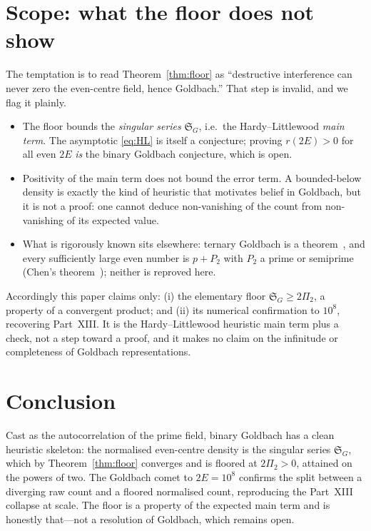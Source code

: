 \documentclass[11pt,a4paper]{article}
\theoremstyle{remark}\newtheorem{remark}{Remark}
\begin{document}
\section{Scope: what the floor does not show}\label{sec:scope}
The temptation is to read Theorem~\ref{thm:floor} as ``destructive interference can
never zero the even-centre field, hence Goldbach.'' That step is invalid, and we
flag it plainly.
\begin{itemize}
\item The floor bounds the \emph{singular series} $\mathfrak{S}_G$, i.e.\ the
  Hardy--Littlewood \emph{main term}. The asymptotic \eqref{eq:HL} is itself a
  conjecture; proving $r(2E)>0$ for all even $2E$ \emph{is} the binary Goldbach
  conjecture, which is open.
\item Positivity of the main term does not bound the error term. A bounded-below
  density is exactly the kind of heuristic that motivates belief in Goldbach, but it
  is not a proof: one cannot deduce non-vanishing of the count from non-vanishing of
  its expected value.
\item What is rigorously known sits elsewhere: ternary Goldbach is a
  theorem~\cite{Helfgott}, and every sufficiently large even number is $p+P_2$ with
  $P_2$ a prime or semiprime (Chen's theorem~\cite{ChenJR}); neither is reproved
  here.
\end{itemize}
Accordingly this paper claims only: (i) the elementary floor
$\mathfrak{S}_G\ge2\Pi_2$, a property of a convergent product; and (ii) its
numerical confirmation to $10^8$, recovering Part~XIII. It is the
Hardy--Littlewood heuristic main term plus a check, not a step toward a proof, and
it makes no claim on the infinitude or completeness of Goldbach representations.

\section{Conclusion}
Cast as the autocorrelation of the prime field, binary Goldbach has a clean
heuristic skeleton: the normalised even-centre density is the singular series
$\mathfrak{S}_G$, which by Theorem~\ref{thm:floor} converges and is floored at
$2\Pi_2>0$, attained on the powers of two. The Goldbach comet to $2E=10^8$ confirms
the split between a diverging raw count and a floored normalised count, reproducing
the Part~XIII collapse at scale. The floor is a property of the expected main term
and is honestly that---not a resolution of Goldbach, which remains open.
\end{document}
